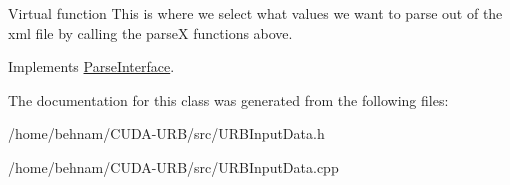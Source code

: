 Virtual function This is where we select what values we want to parse out of the xml file by calling the parseX functions above. 

Implements \hyperlink{classParseInterface_afca32108192ba0997c9e5a78189b0cbc}{Parse\+Interface}.



The documentation for this class was generated from the following files\+:\begin{DoxyCompactItemize}
\item 
/home/behnam/\+C\+U\+D\+A-\/\+U\+R\+B/src/U\+R\+B\+Input\+Data.\+h\item 
/home/behnam/\+C\+U\+D\+A-\/\+U\+R\+B/src/U\+R\+B\+Input\+Data.\+cpp\end{DoxyCompactItemize}
